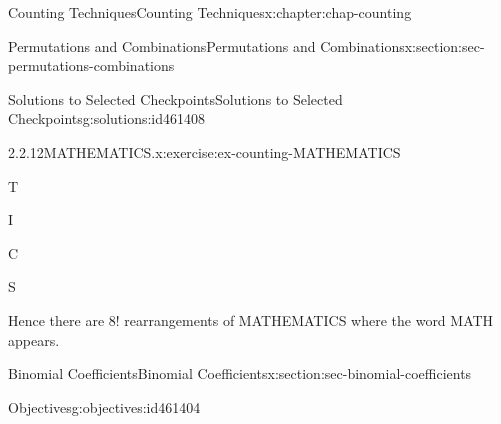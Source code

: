 \documentclass[oneside,10pt,]{book}
\newcommand{\blocktitlefont}{\relax}
\numberwithin{equation}{section}
\begin{document}
\begin{chapterptx}{Counting Techniques}{}{Counting Techniques}{}{}{x:chapter:chap-counting}
\begin{sectionptx}{Permutations and Combinations}{}{Permutations and Combinations}{}{}{x:section:sec-permutations-combinations}
\begin{solutions-subsection}{Solutions to Selected Checkpoints}{}{Solutions to Selected Checkpoints}{}{}{g:solutions:id461408}
\begin{inlineexercisesolution}{2.2.12}{MATHEMATICS.}{x:exercise:ex-counting-MATHEMATICS}
\begin{sidebyside}{8}{0.02375}{0.02375}{0.0475}
\begin{sbspanel}{0.07}%
\par
T%
\end{sbspanel}%
\begin{sbspanel}{0.07}%
\par
I%
\end{sbspanel}%
\begin{sbspanel}{0.07}%
\par
C%
\end{sbspanel}%
\begin{sbspanel}{0.07}%
\par
S%
\end{sbspanel}%
\end{sidebyside}%
\par
Hence there are \(8!\) rearrangements of MATHEMATICS where the word MATH appears.%
\end{inlineexercisesolution}
\end{solutions-subsection}
\end{sectionptx}
%
%
\typeout{************************************************}
\typeout{************************************************}
%
\begin{sectionptx}{Binomial Coefficients}{}{Binomial Coefficients}{}{}{x:section:sec-binomial-coefficients}
\begin{objectives}{Objectives}{g:objectives:id461404}

\end{objectives}
\end{sectionptx}
\end{chapterptx}
\end{document}
